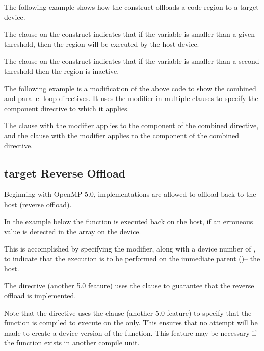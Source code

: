 The following example shows how the  construct offloads a code region 
to a target device.

The  clause on the  construct indicates that if the variable 
 is smaller than a given threshold, then the  region will be executed 
by the host device.

The  clause on the  construct indicates that if the 
variable  is smaller than a second threshold then the  region 
is inactive.



The following example is a modification of the above  code to show the combined 
and parallel loop directives. It uses the  modifier in multiple 
clauses to specify the component directive to which it applies. 

The  clause with the  modifier applies to the  component of the 
combined directive, and the  clause with the  modifier applies 
to the  component of the combined directive.    



\subsection{target Reverse Offload}
\label{subsec:target_reverse_offload}

Beginning with OpenMP 5.0, implementations are allowed to
offload back to the host (reverse offload).

In the example below the  function
is executed back on the host, if an erroneous value is
detected in the  array on the device.

This is accomplished by specifying the 
 modifier, along with a device number of ,
to indicate that the execution is to be performed on the
immediate parent ()-- the host.

The  directive (another 5.0 feature)
uses the  clause to guarantee
that the reverse offload is implemented.

Note that the  directive uses the
 clause (another 5.0 feature) to specify that
the  function is compiled to
execute on the  only. This ensures that no
attempt will be made to create a device version of the
function.  This feature may be necessary if the function
exists in another compile unit.



